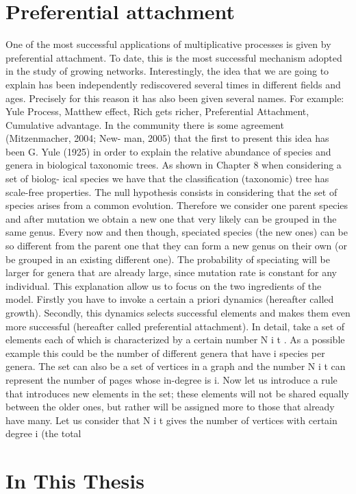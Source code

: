 \section {Preferential attachment}

One of the most successful applications of multiplicative processes is given
by preferential attachment. To date, this is the most successful mechanism
adopted in the study of growing networks. Interestingly, the idea that we
are going to explain has been independently rediscovered several times in
diﬀerent ﬁelds and ages. Precisely for this reason it has also been given
several names. For example: Yule Process, Matthew eﬀect, Rich gets richer,
Preferential Attachment, Cumulative advantage.
In the community there is some agreement (Mitzenmacher, 2004; New-
man, 2005) that the ﬁrst to present this idea has been G. Yule (1925) in
order to explain the relative abundance of species and genera in biological
taxonomic trees. As shown in Chapter 8 when considering a set of biolog-
ical species we have that the classiﬁcation (taxonomic) tree has scale-free
properties. The null hypothesis consists in considering that the set of species
arises from a common evolution. Therefore we consider one parent species
and after mutation we obtain a new one that very likely can be grouped
in the same genus. Every now and then though, speciated species (the new
ones) can be so diﬀerent from the parent one that they can form a new genus
on their own (or be grouped in an existing diﬀerent one). The probability
of speciating will be larger for genera that are already large, since mutation
rate is constant for any individual.
This explanation allow us to focus on the two ingredients of the model.
Firstly you have to invoke a certain a priori dynamics (hereafter called
growth). Secondly, this dynamics selects successful elements and makes
them even more successful (hereafter called preferential attachment). In
detail, take a set of elements each of which is characterized by a certain
number N i t . As a possible example this could be the number of diﬀerent
genera that have i species per genera. The set can also be a set of vertices
in a graph and the number N i t can represent the number of pages whose
in-degree is i. Now let us introduce a rule that introduces new elements in
the set; these elements will not be shared equally between the older ones,
but rather will be assigned more to those that already have many. Let us
consider that N i t gives the number of vertices with certain degree i (the total


\section{In This Thesis}


